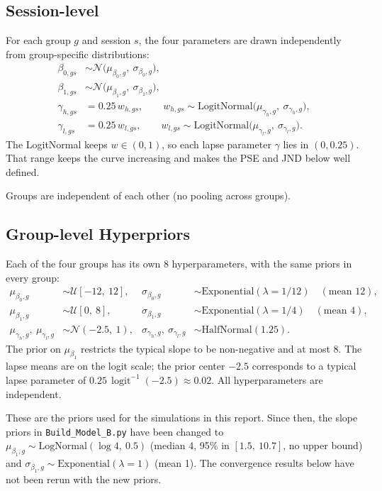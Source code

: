 \documentclass[11pt]{article}
\newcommand{\invlogit}{\operatorname{logit}^{-1}}
\newcommand{\code}[1]{\texttt{#1}}
\begin{document}
\subsection{Session-level}

For each group $g$ and session $s$, the four parameters are drawn independently
from group-specific distributions:
\begin{align*}
  \beta_{0,gs} &\sim \mathcal{N}\big(\mu_{\beta_0,g},\ \sigma_{\beta_0,g}\big), \\
  \beta_{1,gs} &\sim \mathcal{N}\big(\mu_{\beta_1,g},\ \sigma_{\beta_1,g}\big), \\
  \gamma_{h,gs} &= 0.25\, w_{h,gs}, \qquad
      w_{h,gs} \sim \text{LogitNormal}\big(\mu_{\gamma_h,g},\ \sigma_{\gamma_h,g}\big), \\
  \gamma_{l,gs} &= 0.25\, w_{l,gs}, \qquad
      w_{l,gs} \sim \text{LogitNormal}\big(\mu_{\gamma_l,g},\ \sigma_{\gamma_l,g}\big).
\end{align*}
The LogitNormal keeps $w \in (0,1)$, so each lapse parameter $\gamma$ lies in
$(0, 0.25)$. That range keeps the curve increasing and makes the PSE and JND
below well defined.

Groups are independent of each other (no pooling across groups).

\subsection{Group-level Hyperpriors}


Each of the four groups has its own 8 hyperparameters, with the same priors in
every group:
\begin{align*}
  \mu_{\beta_0,g} &\sim \mathcal{U}[-12,\ 12], &
  \sigma_{\beta_0,g} &\sim \text{Exponential}(\lambda = 1/12) \quad (\text{mean } 12), \\
  \mu_{\beta_1,g} &\sim \mathcal{U}[0,\ 8], &
  \sigma_{\beta_1,g} &\sim \text{Exponential}(\lambda = 1/4) \quad (\text{mean } 4), \\
  \mu_{\gamma_h,g},\ \mu_{\gamma_l,g} &\sim \mathcal{N}(-2.5,\ 1), &
  \sigma_{\gamma_h,g},\ \sigma_{\gamma_l,g} &\sim \text{HalfNormal}(1.25).
\end{align*}
The prior on $\mu_{\beta_1}$ restricts the typical slope to be non-negative and at
most 8. The lapse means are on the logit scale; the prior center $-2.5$
corresponds to a typical lapse parameter of $0.25\,\invlogit(-2.5) \approx 0.02$.
All hyperparameters are independent.

These are the priors used for the simulations in this report. Since then, the
slope priors in \code{Build\_Model\_B.py} have been changed to
$\mu_{\beta_1,g} \sim \text{LogNormal}(\log 4,\ 0.5)$ (median 4, 95\% in
$[1.5,\ 10.7]$, no upper bound) and
$\sigma_{\beta_1,g} \sim \text{Exponential}(\lambda = 1)$ (mean 1). The
convergence results below have not been rerun with the new priors.
\end{document}
